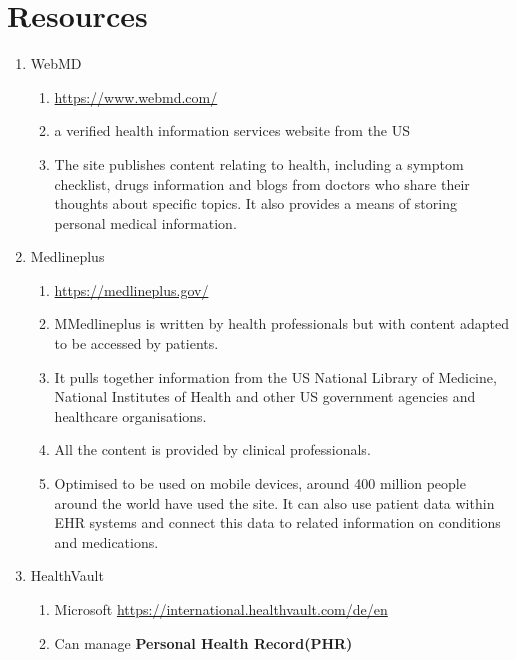 \documentclass[10pt, twoside]{article}   	%
\begin{document}
\section{Resources}
\renewcommand{\labelenumii}{\alph{enumii}}
      \begin{enumerate}
       \item  WebMD  
           \begin{enumerate}
               \item \url{https://www.webmd.com/}
               \item a verified health information services website from the US
               \item The site publishes content relating to health, including a symptom checklist, drugs information and blogs from doctors who share their thoughts about specific topics. It also provides a means of storing personal medical information.
           \end{enumerate}
       \item Medlineplus 
           \begin{enumerate}
               \item \url{https://medlineplus.gov/}
               \item MMedlineplus is written by health professionals but with content adapted to be accessed by patients.
               \item  It pulls together information from the US National Library of Medicine, National Institutes of Health and other US government agencies and healthcare organisations. 
               \item All the content is provided by clinical professionals.
               \item Optimised to be used on mobile devices, around 400 million people around the world have used the site. It can also use patient data within EHR systems and connect this data to related information on conditions and medications.
           \end{enumerate}
       \item HealthVault 
           \begin{enumerate}
               \item Microsoft \url{https://international.healthvault.com/de/en}
               \item Can manage \textbf{Personal Health Record(PHR)} 

\end{enumerate}
\end{enumerate}
\end{document}

